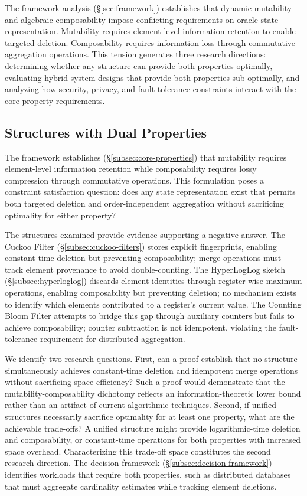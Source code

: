 The framework analysis (\S\ref{sec:framework}) establishes that dynamic mutability and algebraic composability impose conflicting requirements on oracle state representation. Mutability requires element-level information retention to enable targeted deletion. Composability requires information loss through commutative aggregation operations. This tension generates three research directions: determining whether any structure can provide both properties optimally, evaluating hybrid system designs that provide both properties sub-optimally, and analyzing how security, privacy, and fault tolerance constraints interact with the core property requirements.

\subsection{Structures with Dual Properties}
\label{subsec:dual-properties}

The framework establishes (\S\ref{subsec:core-properties}) that mutability requires element-level information retention while composability requires lossy compression through commutative operations. This formulation poses a constraint satisfaction question: does any state representation exist that permits both targeted deletion and order-independent aggregation without sacrificing optimality for either property?

The structures examined provide evidence supporting a negative answer. The Cuckoo Filter (\S\ref{subsec:cuckoo-filters}) stores explicit fingerprints, enabling constant-time deletion but preventing composability; merge operations must track element provenance to avoid double-counting. The HyperLogLog sketch (\S\ref{subsec:hyperloglog}) discards element identities through register-wise maximum operations, enabling composability but preventing deletion; no mechanism exists to identify which elements contributed to a register's current value. The Counting Bloom Filter attempts to bridge this gap through auxiliary counters but fails to achieve composability; counter subtraction is not idempotent, violating the fault-tolerance requirement for distributed aggregation.

We identify two research questions. First, can a proof establish that no structure simultaneously achieves constant-time deletion and idempotent merge operations without sacrificing space efficiency? Such a proof would demonstrate that the mutability-composability dichotomy reflects an information-theoretic lower bound rather than an artifact of current algorithmic techniques. Second, if unified structures necessarily sacrifice optimality for at least one property, what are the achievable trade-offs? A unified structure might provide logarithmic-time deletion and composability, or constant-time operations for both properties with increased space overhead. Characterizing this trade-off space constitutes the second research direction. The decision framework (\S\ref{subsec:decision-framework}) identifies workloads that require both properties, such as distributed databases that must aggregate cardinality estimates while tracking element deletions.

